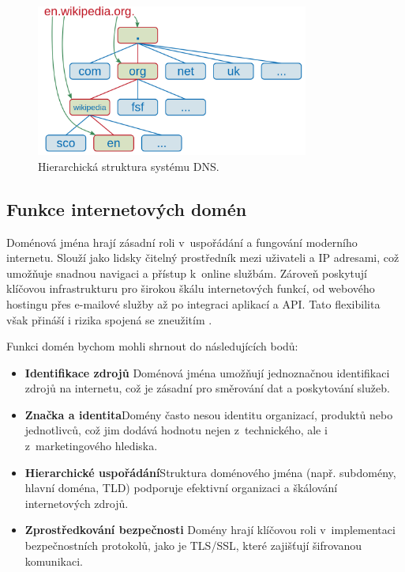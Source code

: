 \begin{figure}[h!]
    \centering
    \includegraphics[width=0.8\textwidth]{obrazky-figures/DNS_schema.png}
    \caption{Hierarchická struktura systému DNS.}
    \label{fig:dns_schema}
\end{figure}

\subsection{Funkce internetových domén}
Doménová jména hrají zásadní roli v~uspořádání a fungování moderního internetu. Slouží jako lidsky čitelný prostředník mezi uživateli a IP adresami, což umožňuje snadnou navigaci a přístup k~online službám. Zároveň poskytují klíčovou infrastrukturu pro širokou škálu internetových funkcí, od webového hostingu přes e-mailové služby až po integraci aplikací a API. Tato flexibilita však přináší i rizika spojená se zneužitím \cite{komaitis2010domain}.

Funkci domén bychom mohli shrnout do následujících bodů:
\begin{itemize}
    \item \textbf{Identifikace zdrojů} Doménová jména umožňují jednoznačnou identifikaci zdrojů na internetu, což je zásadní pro směrování dat a poskytování služeb.
    \item \textbf{Značka a identita}Domény často nesou identitu organizací, produktů nebo jednotlivců, což jim dodává hodnotu nejen z~technického, ale i z~marketingového hlediska.
    \item \textbf{Hierarchické uspořádání}Struktura doménového jména (např. subdomény, hlavní doména, TLD) podporuje efektivní organizaci a škálování internetových zdrojů.
    \item \textbf{Zprostředkování bezpečnosti} Domény hrají klíčovou roli v~implementaci bezpečnostních protokolů, jako je TLS/SSL, které zajišťují šifrovanou komunikaci.
\end{itemize}





